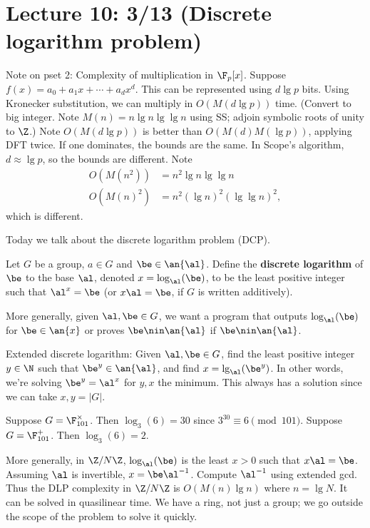 \section{Lecture 10: 3/13 (Discrete logarithm problem)}
Note on pset 2: Complexity of multiplication in $\F_p[x]$. Suppose $f(x)=a_0+a_1x+\cdots +a_dx^d$. This can be represented using $d\lg p$ bits. Using Kronecker substitution, we can multiply in $O(M(d\lg p))$ time. (Convert to big integer. Note $M(n)=n\lg n\lg \lg n$ using SS; adjoin symbolic roots of unity to $\Z$.) Note $O(M(d\lg p))$ is better than $O(M(d)M(\lg p))$, applying DFT twice. If one dominates, the bounds are the same. In Scope's algorithm, $d\approx \lg p$, so the bounds are different. Note
\begin{align*}
O(M(n^2))&=n^2\lg n\lg\lg n\\
O(M(n)^2)&=n^2(\lg n)^2 (\lg\lg n)^2,
\end{align*}
which is different.

Today we talk about the discrete logarithm problem (DCP).
\begin{df}
Let $G$ be a group, $a\in G$ and $\be\in \an{\al}$. Define the \textbf{discrete logarithm} of $\be$ to the base $\al$, denoted $x=\log_{\al}(\be)$, to be the least positive integer such that $\al^x=\be$ (or $x\al=\be$, if $G$ is written additively).
\end{df}
More generally, given $\al,\be\in G$, we want a program that outputs $\log_{\al}(\be)$ for $\be\in \an{x}$ or proves $\be\nin \an{\al}$ if $\be\nin \an{\al}$.

Extended discrete logarithm: Given $\al,\be\in G$, find the least positive integer $y\in \N$ such that $\be^y\in \an{\al}$, and find $x=\lg_{\al}(\be^y)$. In other words, we're solving $\be^y=\al^x$ for $y,x$ the minimum. This always has a solution since we can take $x,y=|G|$.

\begin{ex}
Suppose $G=\F_{101}^{\times}$. Then $\log_3(6)=30$ since $3^{30}\equiv 6\pmod{101}$. Suppose $G=\F_{101}^+$. Then $\log_3(6)=2$.
\end{ex}
More generally, in $\Z/N\Z$, $\log_{\al}(\be)$ is the least $x>0$ such that $x\al=\be$. Assuming $\al$ is invertible, $x=\be\al^{-1}$. Compute $\al^{-1}$ using extended gcd. Thus the DLP complexity in $\Z/N\Z$ is $O(M(n)\lg n)$ where $n=\lg N$. It can be solved in quasilinear time. 
We have a ring, not just a group; we go outside the scope of the problem to solve it quickly.

